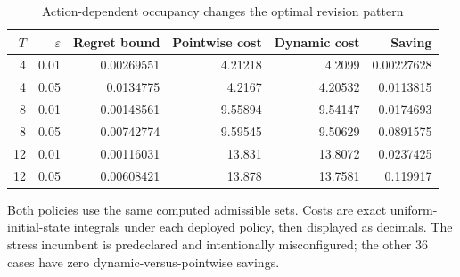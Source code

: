 \begin{table}[htbp]
\centering\footnotesize
\caption{Action-dependent occupancy changes the optimal revision pattern}\label{tab:occupancy}
\begin{tabular}{rrrrrr}\toprule
$T$ & $\varepsilon$ & Regret bound & Pointwise cost & Dynamic cost & Saving \\\midrule
4 & 0.01 & 0.00269551 & 4.21218 & 4.2099 & 0.00227628 \\
4 & 0.05 & 0.0134775 & 4.2167 & 4.20532 & 0.0113815 \\
8 & 0.01 & 0.00148561 & 9.55894 & 9.54147 & 0.0174693 \\
8 & 0.05 & 0.00742774 & 9.59545 & 9.50629 & 0.0891575 \\
12 & 0.01 & 0.00116031 & 13.831 & 13.8072 & 0.0237425 \\
12 & 0.05 & 0.00608421 & 13.878 & 13.7581 & 0.119917 \\
\bottomrule\end{tabular}
\par\smallskip\begin{minipage}{.98\textwidth}\footnotesize Both policies use the same computed admissible sets. Costs are exact uniform-initial-state integrals under each deployed policy, then displayed as decimals. The stress incumbent is predeclared and intentionally misconfigured; the other 36 cases have zero dynamic-versus-pointwise savings.\end{minipage}
\end{table}
